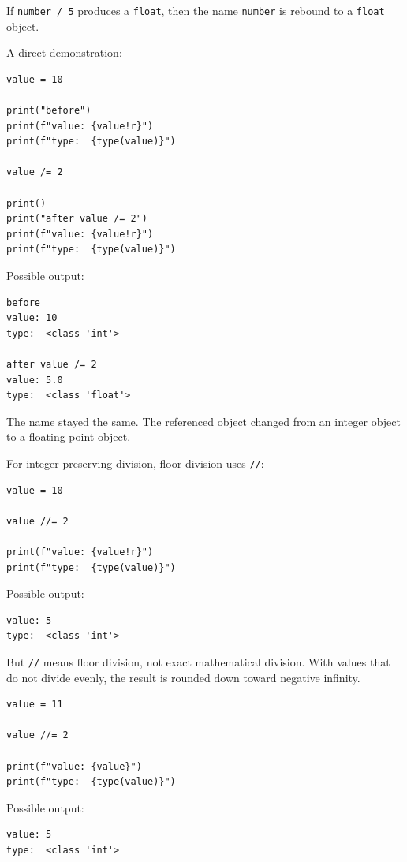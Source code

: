 If \texttt{number / 5} produces a \texttt{float}, then the name \texttt{number} is rebound to a \texttt{float} object.

A direct demonstration:

\begin{verbatim}
value = 10

print("before")
print(f"value: {value!r}")
print(f"type:  {type(value)}")

value /= 2

print()
print("after value /= 2")
print(f"value: {value!r}")
print(f"type:  {type(value)}")
\end{verbatim}

Possible output:

\begin{verbatim}
before
value: 10
type:  <class 'int'>

after value /= 2
value: 5.0
type:  <class 'float'>
\end{verbatim}

The name stayed the same. The referenced object changed from an integer object to a floating-point object.

For integer-preserving division, floor division uses \texttt{//}:

\begin{verbatim}
value = 10

value //= 2

print(f"value: {value!r}")
print(f"type:  {type(value)}")
\end{verbatim}

Possible output:

\begin{verbatim}
value: 5
type:  <class 'int'>
\end{verbatim}

But \texttt{//} means floor division, not exact mathematical division. With values that do not divide evenly, the result is rounded down toward negative infinity.

\begin{verbatim}
value = 11

value //= 2

print(f"value: {value}")
print(f"type:  {type(value)}")
\end{verbatim}

Possible output:

\begin{verbatim}
value: 5
type:  <class 'int'>
\end{verbatim}

